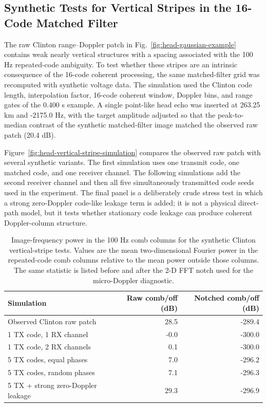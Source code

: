 \subsection{Synthetic Tests for Vertical Stripes in the 16-Code Matched Filter}
\label{app:head-vertical-stripe-simulation}

The raw Clinton range--Doppler patch in Fig.~\ref{fig:head-gaussian-example}
contains weak nearly vertical structures with a spacing associated with the
100 Hz repeated-code ambiguity.  To test whether these stripes are an intrinsic
consequence of the 16-code coherent processing, the same matched-filter grid was
recomputed with synthetic voltage data.  The simulation used the Clinton code
length, interpolation factor, 16-code coherent window, Doppler bins, and range
gates of the 0.400 s example.  A single point-like head echo was inserted at
263.25 km and -2175.0 Hz,
with the target amplitude adjusted so that the peak-to-median contrast of the
synthetic matched-filter image matched the observed raw patch
(20.4 dB).

Figure~\ref{fig:head-vertical-stripe-simulation} compares the observed raw
patch with several synthetic variants.  The first simulation uses one transmit
code, one matched code, and one receiver channel.  The following simulations add
the second receiver channel and then all five simultaneously transmitted code
seeds used in the experiment.  The final panel is a deliberately crude stress
test in which a strong zero-Doppler code-like leakage term is added; it is not a
physical direct-path model, but it tests whether stationary code leakage can
produce coherent Doppler-column structure.

\begin{table}[h]
  \centering
  \caption{Image-frequency power in the 100 Hz comb columns for the synthetic
  Clinton vertical-stripe tests.  Values are the mean two-dimensional Fourier
  power in the repeated-code comb columns relative to the mean power outside
  those columns.  The same statistic is listed before and after the 2-D FFT
  notch used for the micro-Doppler diagnostic.
  }
  \begin{tabular}{lrr}
    \toprule
    Simulation & Raw comb/off (dB) & Notched comb/off (dB) \\
    \midrule
Observed Clinton raw patch & 28.5 & -289.4 \\
1 TX code, 1 RX channel & -0.0 & -300.0 \\
1 TX code, 2 RX channels & 0.1 & -300.0 \\
5 TX codes, equal phases & 7.0 & -296.2 \\
5 TX codes, random phases & 7.1 & -296.3 \\
5 TX + strong zero-Doppler leakage & 29.3 & -296.9 \\
    \bottomrule
  \end{tabular}
  \label{tab:head-vertical-stripe-simulation}
\end{table}

